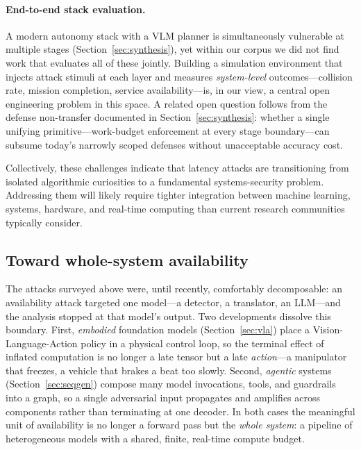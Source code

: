 \documentclass[acmsmall,screen,review,nonacm]{acmart}
\begin{document}
\paragraph{End-to-end stack evaluation.} A modern autonomy stack with a VLM planner is simultaneously vulnerable at multiple stages (Section~\ref{sec:synthesis}), yet within our corpus we did not find work that evaluates all of these jointly. Building a simulation environment that injects attack stimuli at each layer and measures \emph{system-level} outcomes---collision rate, mission completion, service availability---is, in our view, a central open engineering problem in this space. A related open question follows from the defense non-transfer documented in Section~\ref{sec:synthesis}: whether a single unifying primitive---work-budget enforcement at every stage boundary---can subsume today's narrowly scoped defenses without unacceptable accuracy cost.

Collectively, these challenges indicate that latency attacks are transitioning from isolated algorithmic curiosities to a fundamental systems-security problem. Addressing them will likely require tighter integration between machine learning, systems, hardware, and real-time computing than current research communities typically consider.

\subsection{Toward whole-system availability}
\label{sec:wholesystem}
The attacks surveyed above were, until recently, comfortably decomposable: an availability attack targeted one model---a detector, a translator, an LLM---and the analysis stopped at that model's output. Two developments dissolve this boundary. First, \emph{embodied} foundation models (Section~\ref{sec:vla}) place a Vision-Language-Action policy in a physical control loop, so the terminal effect of inflated computation is no longer a late tensor but a late \emph{action}---a manipulator that freezes, a vehicle that brakes a beat too slowly. Second, \emph{agentic} systems (Section~\ref{sec:seqgen}) compose many model invocations, tools, and guardrails into a graph, so a single adversarial input propagates and amplifies across components rather than terminating at one decoder. In both cases the meaningful unit of availability is no longer a forward pass but the \emph{whole system}: a pipeline of heterogeneous models with a shared, finite, real-time compute budget.
\end{document}
